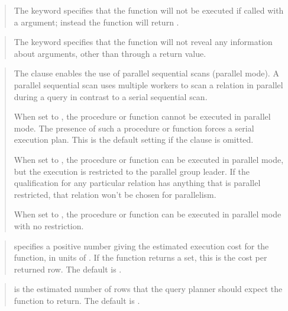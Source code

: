 \documentclass[letterpaper,10pt,english,openany,oneside]{sphinxmanual}
\begin{document}
\begin{quote}

The  keyword specifies that the function will not be executed
if called with a  argument; instead the function will return
.
\end{quote}

\begin{quote}

The  keyword specifies that the function will not reveal
any information about arguments, other than through a return value.
\end{quote}

\begin{quote}

The  clause enables the use of parallel sequential scans
(parallel mode). A parallel sequential scan uses multiple workers to
scan a relation in parallel during a query in contrast to a serial
sequential scan.

When set to , the procedure or function cannot be executed in
parallel mode. The presence of such a procedure or function forces a
serial execution plan. This is the default setting if the 
clause is omitted.

When set to , the procedure or function can be executed in
parallel mode, but the execution is restricted to the parallel group
leader. If the qualification for any particular relation has
anything that is parallel restricted, that relation won’t be chosen
for parallelism.

When set to , the procedure or function can be executed in
parallel mode with no restriction.
\end{quote}

\begin{quote}

 specifies a positive number giving the estimated
execution cost for the function, in units of . If
the function returns a set, this is the cost per returned row. The
default is .
\end{quote}

\begin{quote}

 is the estimated number of rows that the query
planner should expect the function to return. The default is .
\end{quote}
\end{document}
